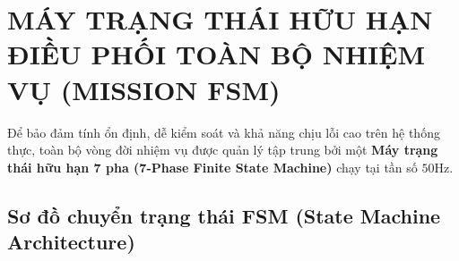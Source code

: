 \documentclass[12pt,a4paper]{article}
\begin{document}
\section{MÁY TRẠNG THÁI HỮU HẠN ĐIỀU PHỐI TOÀN BỘ NHIỆM VỤ (MISSION FSM)}

Để bảo đảm tính ổn định, dễ kiểm soát và khả năng chịu lỗi cao trên hệ thống thực, toàn bộ vòng đời nhiệm vụ được quản lý tập trung bởi một \textbf{Máy trạng thái hữu hạn 7 pha (7-Phase Finite State Machine)} chạy tại tần số $50\text{Hz}$.

\subsection{Sơ đồ chuyển trạng thái FSM (State Machine Architecture)}
\end{document}
